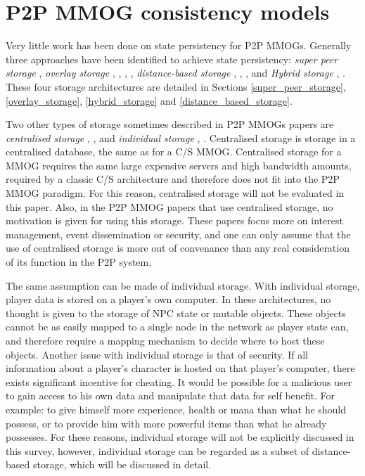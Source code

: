 \documentclass[10pt,a4paper,journal,cspaper,compsoc]{IEEEtran}
\begin{document}
\section{P2P MMOG consistency models}
\label{p2p_mmog_cm_overview}

Very little work has been done on state persistency for P2P MMOGs. Generally three approaches have been identified to achieve state persistency:
\emph{super peer storage} \cite{knutsson_p2p_first}, \emph{overlay storage} \cite{Douglas05enablingmassively}, \cite{using_freenet_storage},
\cite{Fan_phd}, \cite{past_storage_focus}, \emph{distance-based storage} \cite{Buyukkaya_voronoi_state_management}, \cite{Hu_voronoi_IM},
\cite{colyseus_distance_based}, \cite{AtoZ} and \emph{Hybrid storage} \cite{zoned_federation}, \cite{hybrid_storage1}. These four storage
architectures are detailed in Sections \ref{super_peer_storage}, \ref{overlay_storage}, \ref{hybrid_storage} and \ref{distance_based_storage}.

Two other types of storage sometimes described in P2P MMOGs papers are \emph{centralised storage} \cite{badumna_engine},
\cite{rooney_centralised_storage}, \cite{hybrid_p2p_cs_centralised} and \emph{individual storage} \cite{individual_storage1},
\cite{cheat_proof_playout}. Centralised storage is storage in a centralised database, the same as for a C/S MMOG. Centralised storage for a MMOG
requires the same large expensive servers and high bandwidth amounts, required by a classic C/S architecture and therefore does not fit into the P2P
MMOG paradigm. For this reason, centralised storage will not be evaluated in this paper. Also, in the P2P MMOG papers that use centralised storage,
no motivation is given for using this storage. These papers focus more on interest management, event dissemination or security, and one can only
assume that the use of centralised storage is more out of convenance than any real consideration of its function in the P2P system.

The same assumption can be made of individual storage. With individual storage, player data is stored on a player's own computer. In these
architectures, no thought is given to the storage of NPC state or mutable objects. These objects cannot be as easily mapped to a single node in the
network as player state can, and therefore require a mapping mechanism to decide where to host these objects. Another issue with individual storage
is that of security. If all information about a player's character is hosted on that player's computer, there exists significant incentive for
cheating. It would be possible for a malicious user to gain access to his own data and manipulate that data for self benefit. For example: to give
himself more experience, health or mana than what he should possess, or to provide him with more powerful items than what he already possesses. For
these reasons, individual storage will not be explicitly discussed in this survey, however, individual storage can be regarded as a subset of
distance-based storage, which will be discussed in detail.
\end{document}
